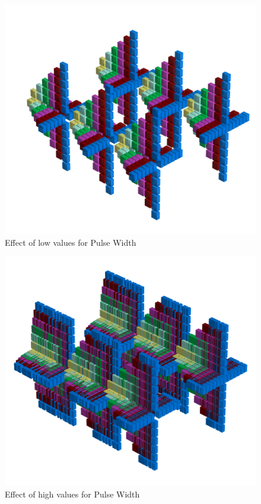 \begin{figure}[H]
    \centering
    \begin{adjustbox}{width=13cm,center}
      \includegraphics[width=13cm]{src/pulsewidth/pattern0-45.png}%
    \end{adjustbox}
    \caption{Effect of low values for Pulse Width}
\end{figure}
\begin{figure}[H]
    \centering
    \begin{adjustbox}{width=13cm}
      \includegraphics[width=13cm]{src/pulsewidth/pattern1-45.png}%
    \end{adjustbox}
    \caption{Effect of high values for Pulse Width}
\end{figure}



